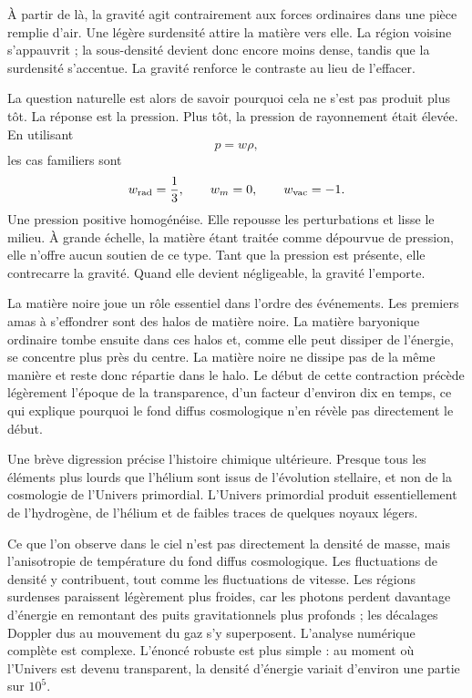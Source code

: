 À partir de là, la gravité agit contrairement aux forces ordinaires dans une pièce remplie d’air. Une légère surdensité attire la matière vers elle. La région voisine s’appauvrit ; la sous-densité devient donc encore moins dense, tandis que la surdensité s’accentue. La gravité renforce le contraste au lieu de l’effacer.

La question naturelle est alors de savoir pourquoi cela ne s’est pas produit plus tôt. La réponse est la pression. Plus tôt, la pression de rayonnement était élevée. En utilisant
\begin{equation}
p=w\rho,
\end{equation}
les cas familiers sont
\begin{equation}
w_{\rm rad}=\frac13,\qquad
w_m=0,\qquad
w_{\rm vac}=-1.
\end{equation}
Une pression positive homogénéise. Elle repousse les perturbations et lisse le milieu. À grande échelle, la matière étant traitée comme dépourvue de pression, elle n’offre aucun soutien de ce type. Tant que la pression est présente, elle contrecarre la gravité. Quand elle devient négligeable, la gravité l’emporte.

La matière noire joue un rôle essentiel dans l’ordre des événements. Les premiers amas à s’effondrer sont des halos de matière noire. La matière baryonique ordinaire tombe ensuite dans ces halos et, comme elle peut dissiper de l’énergie, se concentre plus près du centre. La matière noire ne dissipe pas de la même manière et reste donc répartie dans le halo. Le début de cette contraction précède légèrement l’époque de la transparence, d’un facteur d’environ dix en temps, ce qui explique pourquoi le fond diffus cosmologique n’en révèle pas directement le début.

Une brève digression précise l’histoire chimique ultérieure. Presque tous les éléments plus lourds que l’hélium sont issus de l’évolution stellaire, et non de la cosmologie de l’Univers primordial. L’Univers primordial produit essentiellement de l’hydrogène, de l’hélium et de faibles traces de quelques noyaux légers.

Ce que l’on observe dans le ciel n’est pas directement la densité de masse, mais l’anisotropie de température du fond diffus cosmologique. Les fluctuations de densité y contribuent, tout comme les fluctuations de vitesse. Les régions surdenses paraissent légèrement plus froides, car les photons perdent davantage d’énergie en remontant des puits gravitationnels plus profonds ; les décalages Doppler dus au mouvement du gaz s’y superposent. L’analyse numérique complète est complexe. L’énoncé robuste est plus simple : au moment où l’Univers est devenu transparent, la densité d’énergie variait d’environ une partie sur \(10^5\).


